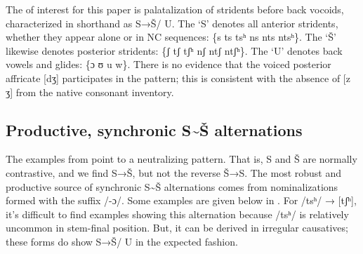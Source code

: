 The  of interest for this paper is palatalization of stridents before back vocoids, characterized in shorthand as S→Š/ {\longrule} U. The ‘S’ denotes all anterior stridents, whether they appear alone or in NC sequences: \{s ts tsʰ ns nts ntsʰ\}. The ‘Š’ likewise denotes posterior stridents: \{ʃ tʃ tʃʰ nʃ ntʃ ntʃʰ\}. The ‘U’ denotes back vowels and glides: \{ɔ ʊ u w\}. There is no evidence that the voiced posterior affricate [dʒ] participates in the pattern; this is consistent with the absence of [z ʒ] from the native consonant inventory.

\subsection{Productive, synchronic S{\textasciitilde}Š alternations}\label{sec:bennett:2.3}

The examples from  point to a neutralizing pattern. That is, S and Š are normally contrastive, and we find S→Š, but not the reverse Š→S. The most robust and productive source of synchronic S{\textasciitilde}Š alternations comes from nominalizations formed with the suffix /-ɔ/. Some examples are given below in . For /tsʰ/ → [tʃʰ], it’s difficult to find examples showing this alternation because /tsʰ/ is relatively uncommon in stem-final position. But, it can be derived in irregular causatives; these forms do show S→Š/ {\longrule} U in the expected fashion.

